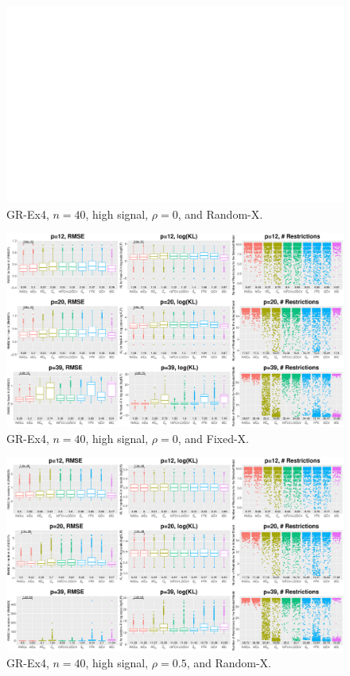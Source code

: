 \clearpage
\begin{figure}[!ht]
\centering
\includegraphics[width=\textwidth]{figures/supplement/randomx_GR-Ex4_n40_hsnr_rho0.eps}
\caption{GR-Ex4, $n=40$, high signal, $\rho=0$, and Random-X.}
\end{figure}
\begin{figure}[!ht]
\centering
\includegraphics[width=\textwidth]{figures/supplement/fixedx_GR-Ex4_n40_hsnr_rho0.eps}
\caption{GR-Ex4, $n=40$, high signal, $\rho=0$, and Fixed-X.}
\end{figure}
\clearpage
\begin{figure}[!ht]
\centering
\includegraphics[width=\textwidth]{figures/supplement/randomx_GR-Ex4_n40_hsnr_rho05.eps}
\caption{GR-Ex4, $n=40$, high signal, $\rho=0.5$, and Random-X.}
\end{figure}
